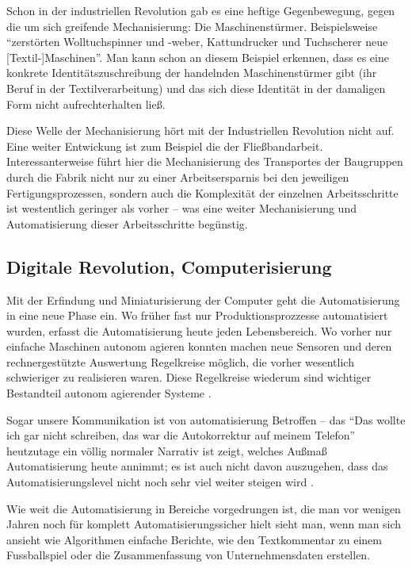 Schon in der industriellen Revolution gab es eine heftige Gegenbewegung, gegen die um sich greifende Mechanisierung: Die Maschinenstürmer.
Beispielsweise \enquote{zerstörten Wolltuchspinner und -weber, Kattundrucker und Tuchscherer neue [Textil-]Maschinen}\parencite[44]{spehr}.
Man kann schon an diesem Beispiel erkennen, dass es eine konkrete Identitätszuschreibung der handelnden Maschinenstürmer gibt (ihr Beruf in der Textilverarbeitung) und das sich diese Identität in der damaligen Form nicht aufrechterhalten ließ.


Diese Welle der Mechanisierung hört mit der Industriellen Revolution nicht auf.
Eine weiter Entwickung ist zum Beispiel die der Fließbandarbeit.
Interessanterweise führt hier die Mechanisierung des Transportes der Baugruppen durch die Fabrik nicht nur zu einer Arbeitsersparnis bei den jeweiligen Fertigungsprozessen, sondern auch die Komplexität der einzelnen Arbeitsschritte ist westentlich geringer als vorher – was eine weiter Mechanisierung und Automatisierung dieser Arbeitsschritte begünstig.




\subsection {Digitale Revolution, Computerisierung}
Mit der Erfindung und Miniaturisierung der Computer geht die Automatisierung in eine neue Phase ein. Wo früher fast nur Produktionsprozzesse automatisiert wurden, erfasst die Automatisierung heute jeden Lebensbereich.
Wo vorher nur einfache Maschinen autonom agieren konnten machen neue Sensoren und deren rechnergestützte Auswertung Regelkreise möglich, die vorher wesentlich schwieriger zu realisieren waren.
Diese Regelkreise wiederum sind wichtiger Bestandteil autonom agierender Systeme \parencite{ulrich}.

Sogar unsere Kommunikation ist von automatisierung Betroffen – das \enquote{Das wollte ich gar nicht schreiben, das war die Autokorrektur auf meinem Telefon} heutzutage ein völlig normaler Narrativ ist zeigt, welches Außmaß Automatisierung heute annimmt; es ist auch nicht davon auszugehen, dass das Automatisierungslevel nicht noch sehr viel weiter steigen wird \parencite{arbeitsfrei}.

Wie weit die Automatisierung in Bereiche vorgedrungen ist, die man vor wenigen Jahren noch für komplett Automatisierungssicher hielt sieht man, wenn man sich ansieht wie Algorithmen einfache Berichte, wie den Textkommentar zu einem Fussballspiel oder die Zusammenfassung von Unternehmensdaten erstellen.

